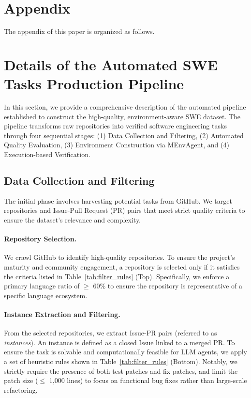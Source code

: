 \documentclass{article}
\theoremstyle{plain}
\theoremstyle{definition}
\theoremstyle{remark}
\begin{document}
\newpage


\newpage
\appendix
\onecolumn
\section*{Appendix}
The appendix of this paper is organized as follows. 

\section{Details of the Automated SWE Tasks Production Pipeline}\label{append:data_production}

In this section, we provide a comprehensive description of the automated pipeline established to construct the high-quality, environment-aware SWE dataset. The pipeline transforms raw repositories into verified software engineering tasks through four sequential stages: (1) Data Collection and Filtering, (2) Automated Quality Evaluation, (3) Environment Construction via MEnvAgent, and (4) Execution-based Verification.

\subsection{Data Collection and Filtering}
The initial phase involves harvesting potential tasks from GitHub. We target repositories and Issue-Pull Request (PR) pairs that meet strict quality criteria to ensure the dataset's relevance and complexity.

\paragraph{Repository Selection.}
We crawl GitHub to identify high-quality repositories. To ensure the project's maturity and community engagement, a repository is selected only if it satisfies the criteria listed in Table~\ref{tab:filter_rules} (Top). Specifically, we enforce a primary language ratio of $\ge$ 60\% to ensure the repository is representative of a specific language ecosystem.

\paragraph{Instance Extraction and Filtering.}
From the selected repositories, we extract Issue-PR pairs (referred to as \textit{instances}). An instance is defined as a closed Issue linked to a merged PR. To ensure the task is solvable and computationally feasible for LLM agents, we apply a set of heuristic rules shown in Table~\ref{tab:filter_rules} (Bottom). Notably, we strictly require the presence of both test patches and fix patches, and limit the patch size ($\le$ 1,000 lines) to focus on functional bug fixes rather than large-scale refactoring.
\end{document}
